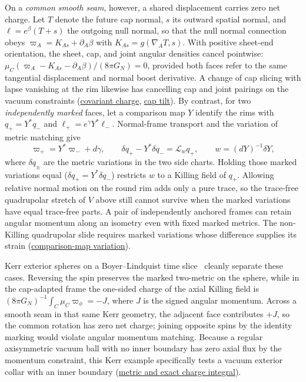\documentclass[10pt,a4paper]{article}
\numberwithin{equation}{section}
\newcommand{\repo}[2]{\href{https://github.com/sprajs/quantum-gravity/blob/main/#1}{#2}}
\begin{document}
On a \emph{common smooth seam}, however, a shared displacement carries zero net charge. Let $T$ denote the future cap normal, $s$ its outward spatial normal, and $\ell=e^\beta(T+s)$ the outgoing null normal, so that the null normal connection obeys $\varpi_A=K_{As}+\partial_A\beta$ with $K_{As}=g(\nabla_A T,s)$. With positive sheet-end orientation, the sheet, cap, and joint angular densities cancel pointwise: $\mu_C(\varpi_A-K_{As}-\partial_A\beta)/(8\pi G_N)=0$, provided both faces refer to the same tangential displacement and normal boost derivative. A change of cap slicing with lapse vanishing at the rim likewise has cancelling cap and joint pairings on the vacuum constraints (\repo{audit/match-action.md}{covariant charge}, \repo{audit/match-boost.md}{cap tilt}). By contrast, for two \emph{independently marked} faces, let a comparison map $Y$ identify the rims with $q_+=Y^*q_-$ and $\ell_+=e^\gamma Y^*\ell_-$. Normal-frame transport and the variation of metric matching give
\begin{equation}
 \varpi_+=Y^*\varpi_-+d\gamma,\qquad
 \delta q_+-Y^*\delta q_-=\mathcal L_w q_+,\qquad
 w=(dY)^{-1}\delta Y ,
 \label{eq:marked-cap-matching}
\end{equation}
where $\delta q_\pm$ are the metric variations in the two side charts. Holding those marked variations equal ($\delta q_+=Y^*\delta q_-$) restricts $w$ to a Killing field of $q_+$. Allowing relative normal motion on the round rim adds only a pure trace, so the trace-free quadrupolar stretch of $V$ above still cannot survive when the marked variations have equal trace-free parts. A pair of independently anchored frames can retain angular momentum along an isometry even with fixed marked metrics. The non-Killing quadrupolar slide requires marked variations whose difference supplies its strain (\repo{audit/match-reduction.md}{comparison-map variation}).

Kerr exterior spheres on a Boyer--Lindquist time slice~\cite{BoyerLindquist1967} cleanly separate these cases. Reversing the spin preserves the marked two-metric on the sphere, while in the cap-adapted frame the one-sided charge of the axial Killing field is $(8\pi G_N)^{-1}\int_C\mu_C\varpi_\phi=-J$, where $J$ is the signed angular momentum. Across a smooth seam in that same Kerr geometry, the adjacent face contributes $+J$, so the common rotation has zero net charge; joining opposite spins by the identity marking would violate angular momentum matching. Because a regular axisymmetric vacuum ball with no inner boundary has zero axial flux by the momentum constraint, this Kerr example specifically tests a vacuum exterior collar with an inner boundary (\repo{audit/match-rotation.md}{metric and exact charge integral}).
\end{document}
